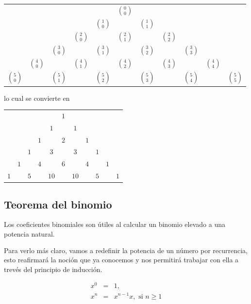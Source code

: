 \begin{center}
\begin{tabular}{ccccccccccc}\\
	& & & & & $\binom{0}{0}$ & & & & &\\
	& & & & $\binom{1}{0}$ & & $\binom{1}{1}$ & & & &\\
	& & & $\binom{2}{0}$ & & $\binom{2}{1}$ & & $\binom{2}{2}$ & & &\\
	& & $\binom{3}{0}$ & & $\binom{3}{1}$ & & $\binom{3}{2}$ & & $\binom{3}{3}$ & &\\
	& $\binom{4}{0}$ & & $\binom{4}{1}$ & & $\binom{4}{2}$ & & $\binom{4}{3}$ & & $\binom{4}{4}$ &\\
	$\binom{5}{0}$ & & $\binom{5}{1}$ & & $\binom{5}{2}$ & & $\binom{5}{3}$ & & $\binom{5}{4}$ & & $\binom{5}{5}$
\end{tabular}
\end{center}

\medskip
lo cual se convierte en
\begin{center}
\begin{tabular}{ccccccccccc}\\
	& & & & & $1$ & & & & &\\
	& & & & $1$ & & $1$ & & & &\\
	& & & $1$ & & $2$ & & $1$ & & &\\
	& & $1$ & & $3$ & & $3$ & & $1$ & &\\
	& $1$ & & $4$ & & $6$ & & $4$ & & $1$ &\\
	$1$ & & $5$ & & $10$ & & $10$ & & $5$ & & $1$
\end{tabular}
\end{center}

\medskip

\subsection{Teorema del binomio}

Los coeficientes binomiales son \'utiles al calcular un binomio elevado a una
potencia natural.

Para verlo más claro, vamos a redefinir la potencia de un número por recurrencia, esto reafirmará la noción que ya conocemos y nos permitirá trabajar con ella a trevés del principio de inducción.

\begin{eqnarray*}
  x^0 &=& 1,\\
  x^n &=& x^{n-1}x, \textrm{ si }n\ge1
\end{eqnarray*}

